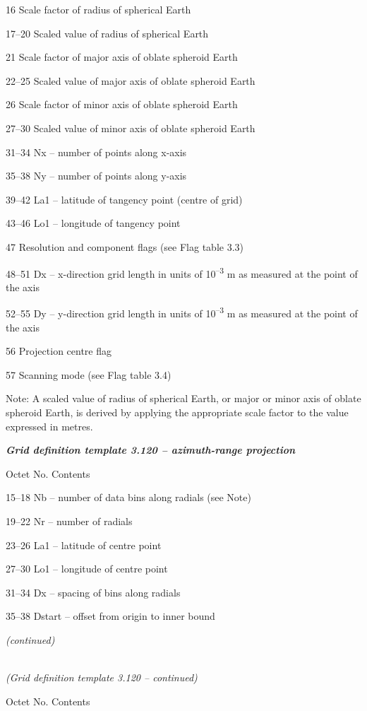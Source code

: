 16 Scale factor of radius of spherical Earth

17--20 Scaled value of radius of spherical Earth

21 Scale factor of major axis of oblate spheroid Earth

22--25 Scaled value of major axis of oblate spheroid Earth

26 Scale factor of minor axis of oblate spheroid Earth

27--30 Scaled value of minor axis of oblate spheroid Earth

31--34 Nx -- number of points along x-axis

35--38 Ny -- number of points along y-axis

39--42 La1 -- latitude of tangency point (centre of grid)

43--46 Lo1 -- longitude of tangency point

47 Resolution and component flags (see Flag table 3.3)

48--51 Dx -- x-direction grid length in units of 10\textsuperscript{--3} m as measured at the point of the axis

52--55 Dy -- y-direction grid length in units of 10\textsuperscript{--3} m as measured at the point of the axis

56 Projection centre flag

57 Scanning mode (see Flag table 3.4)

Note: A scaled value of radius of spherical Earth, or major or minor axis of oblate spheroid Earth, is derived by applying the appropriate scale factor to the value expressed in metres.

\emph{\textbf{Grid definition template 3.120 -- azimuth-range projection}}

Octet No. Contents

15--18 Nb -- number of data bins along radials (see Note)

19--22 Nr -- number of radials

23--26 La1 -- latitude of centre point

27--30 Lo1 -- longitude of centre point

31--34 Dx -- spacing of bins along radials

35--38 Dstart -- offset from origin to inner bound

\emph{(continued)}

\emph{\\
(Grid definition template 3.120 -- continued)}

Octet No. Contents

